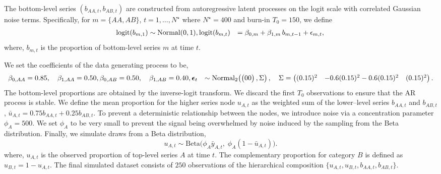 The bottom-level series \((b_{AA, t}, b_{AB, t})\) are constructed from autoregressive latent processes on the logit scale with correlated Gaussian noise terms. Specifically, for \(m = \{AA,AB\}\), \(t = 1,\dots,N^\star\) where \(N^\star = 400\) and burn-in \(T_0 = 150\), we define
\begin{equation}
    \begin{aligned}
    \text{logit}(b_{m,1}) &\sim \text{Normal}(0,1),\newline
    \text{logit}(b_{m,t}) &= \beta_{0,m} + \beta_{1,m}\,b_{m,t-1} + \epsilon_{m, t}, \newline
    \end{aligned}
\end{equation}
where, \(b_{m, t}\) is the proportion of bottom-level series \(m\) at time \(t\). \newline

We set the coefficients of the data generating process to be,
\begin{align}
\beta_{0,AA} &=0.85,\quad \beta_{1,AA}=0.50, \nonumber \newline
\beta_{0,AB} =0.50, \quad \beta_{1,AB}=0.40, \nonumber \newline
\boldsymbol{\epsilon}_{t}
& \sim
\text{Normal}_2\!\left(
\begin{pmatrix}
0\newline
0
\end{pmatrix},
\Sigma
\right), \quad
\Sigma =
\begin{pmatrix}
(0.15)^2 & -0.6(0.15)^2 \newline
-0.6(0.15)^2 & (0.15)^2
\end{pmatrix}. \nonumber
\end{align}
The bottom-level proportions are obtained by the inverse-logit transform. We discard the first \(T_{0}\) observations to ensure that the AR process is stable. We define the mean proportion for the higher series node \(u_{A,t}\) as the weighted sum of the lower--level series \(b_{AA, t}\) and \(b_{AB, t}\), \(\bar{u}_{A,t} = 0.75b_{AA, t}+ 0.25b_{AB, t}\). To prevent a deterministic relationship between the nodes, we introduce noise via a concentration parameter \(\phi_A = 500\). We set \(\phi_A\) to be very small to prevent the signal being overwhelmed by noise induced by the sampling from the Beta distribution. Finally, we simulate draws from a Beta distribution,
\begin{equation}
    u_{A,t} \sim \text{Beta}\big(\phi_A \bar{y}_{A,t},\; \phi_A(1 - \bar{u}_{A,t})\big).
\end{equation}
where, \(u_{A, t}\) is the observed proportion of top-level series \(A\) at time \(t\). \newline
The complementary proportion for category \(B\) is defined as \(u_{B,t} = 1 - u_{A,t}\). The final simulated dataset consists of \(250\) observations of the hierarchical composition \(\{u_{A,t}, u_{B,t}, b_{AA,t}, b_{AB,t}\}\).

